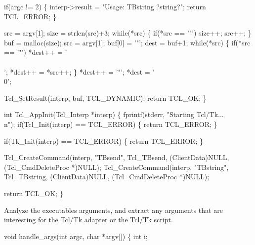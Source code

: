   if(argc != 2) \{
    interp->result = "Usage: TBstring ?string?";
    return TCL_ERROR;
  \}

  src = argv[1];
  size = strlen(src)+3;
  while(*src) \{
    if(*src == '"')
      size++;
    src++;
  \}
  buf = malloc(size);
  src = argv[1];
  buf[0] = '"';
  dest = buf+1;
  while(*src) \{
    if(*src == '"')
      *dest++ = '\\\\';
    *dest++ = *src++;
  \}
  *dest++ = '"';
  *dest = '\\0';
  
  Tcl_SetResult(interp, buf, TCL_DYNAMIC);
  return TCL_OK;
\}
\nwendcode{}\nwdocspar




\nwenddocs{}\endmoddef\let\nwnotused=\nwoutput{}\nwstartdeflinemarkup{}\nwenddeflinemarkup
int Tcl_AppInit(Tcl_Interp *interp)
\{
  fprintf(stderr, "Starting Tcl/Tk...\\n");
  if(Tcl_Init(interp) == TCL_ERROR) \{
    return TCL_ERROR;
  \}

  if(Tk_Init(interp) == TCL_ERROR) \{
    return TCL_ERROR;
  \}

  Tcl_CreateCommand(interp, "TBsend", Tcl_TBsend, (ClientData)NULL, (Tcl_CmdDeleteProc *)NULL);
  Tcl_CreateCommand(interp, "TBstring", Tcl_TBstring, (ClientData)NULL, (Tcl_CmdDeleteProc *)NULL);

  return TCL_OK;
\}
\nwendcode{}\nwdocspar


Analyze the executables arguments, and extract any arguments
that are interesting for the Tcl/Tk adapter or the Tcl/Tk script.

\nwenddocs{}\endmoddef\let\nwnotused=\nwoutput{}\nwstartdeflinemarkup{}\nwenddeflinemarkup
void handle_args(int argc, char *argv[])
\{
  int i;

